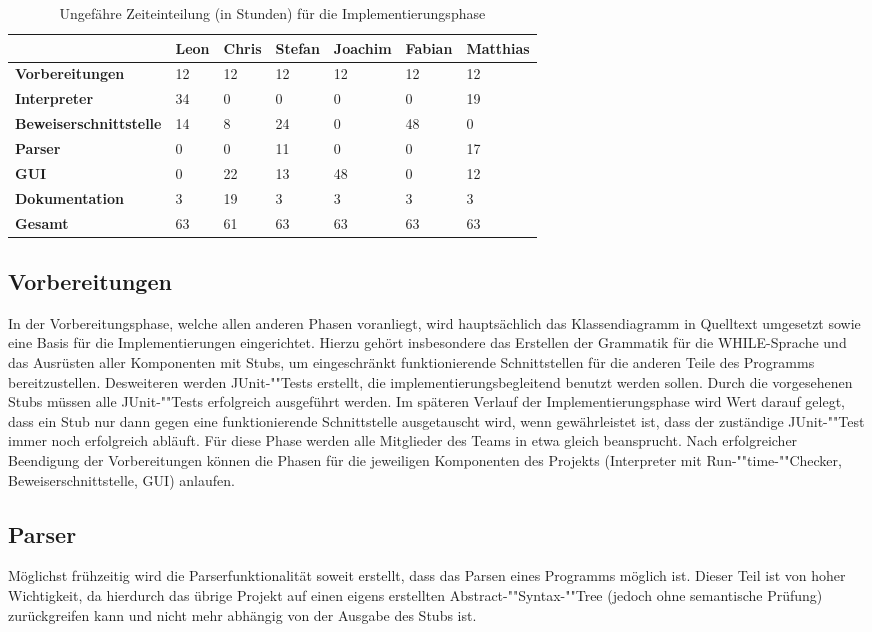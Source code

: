\begin{table}[H]
	\caption[B]{Ungefähre Zeiteinteilung (in Stunden) für die Implementierungsphase}
	\label{timeplan}
	\begin{tabular}{|l|l|l|l|l|l|l|}
		\hline
		 & \textbf{Leon} & \textbf{Chris} & \textbf{Stefan} & \textbf{Joachim} & \textbf{Fabian} & \textbf{Matthias} \\
		\hline
		\textbf{Vorbereitungen} & 12 & 12 & 12 & 12 & 12 & 12 \\
		\hline
		\textbf{Interpreter} & 34 & 0 & 0 & 0 & 0 & 19 \\
		\hline
		\textbf{Beweiserschnittstelle} & 14 & 8 & 24 & 0 & 48 & 0 \\
		\hline
		\textbf{Parser} & 0 & 0 & 11 & 0 & 0 & 17 \\
		\hline
		\textbf{GUI} & 0 & 22 & 13 & 48 & 0 & 12 \\
		\hline
		\textbf{Dokumentation} & 3 & 19 & 3 & 3 & 3 & 3 \\
		\hline
		\textbf{Gesamt}	& 63 & 61 & 63 & 63 & 63 & 63 \\
		\hline
	\end{tabular}
\end{table}

\subsection{Vorbereitungen}
In der Vorbereitungsphase, welche allen anderen Phasen voranliegt, wird hauptsächlich das Klassendiagramm in Quelltext umgesetzt sowie eine Basis für die Implementierungen eingerichtet. Hierzu gehört insbesondere das Erstellen der Grammatik für die WHILE-Sprache und das Ausrüsten aller Komponenten mit Stubs, um eingeschränkt funktionierende Schnittstellen für die anderen Teile des Programms bereitzustellen. Desweiteren werden JUnit-""Tests erstellt, die implementierungsbegleitend benutzt werden sollen. Durch die vorgesehenen Stubs müssen alle JUnit-""Tests erfolgreich ausgeführt werden. Im späteren Verlauf der Implementierungsphase wird Wert darauf gelegt, dass ein Stub nur dann gegen eine funktionierende Schnittstelle ausgetauscht wird, wenn gewährleistet ist, dass der zuständige JUnit-""Test immer noch erfolgreich abläuft. Für diese Phase werden alle Mitglieder des Teams in etwa gleich beansprucht. Nach erfolgreicher Beendigung der Vorbereitungen können die Phasen für die jeweiligen Komponenten des Projekts (Interpreter mit Run-""time-""Checker, Beweiserschnittstelle, GUI) anlaufen.

\subsection{Parser}
Möglichst frühzeitig wird die Parserfunktionalität soweit erstellt, dass das Parsen eines Programms möglich ist. Dieser Teil ist von hoher Wichtigkeit, da hierdurch das übrige Projekt auf einen eigens erstellten Abstract-""Syntax-""Tree (jedoch ohne semantische Prüfung) zurückgreifen kann und nicht mehr abhängig von der Ausgabe des Stubs ist.

